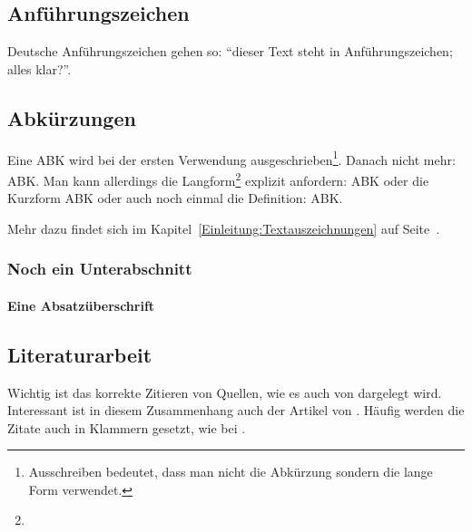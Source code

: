 \subsection{Anführungszeichen}

Deutsche Anführungszeichen gehen so: "`dieser Text steht in \glq Anführungszeichen\grq; alles klar?"'.


\subsection{Abkürzungen}

Eine \ac{ABK} wird bei der ersten Verwendung ausgeschrieben\footnote{Ausschreiben bedeutet, dass man nicht die Abkürzung sondern die lange Form verwendet.}. Danach nicht mehr: \ac{ABK}. Man kann allerdings die Langform\footnote{\blindtext} explizit anfordern: \acl{ABK} oder die Kurzform \acs{ABK} oder auch noch einmal die Definition: \acf{ABK}.

Mehr dazu findet sich im Kapitel~\ref{Einleitung:Textauszeichnungen} auf Seite~\pageref{Einleitung:Textauszeichnungen}.


\subsubsection{Noch ein Unterabschnitt}

\paragraph{Eine Absatzüberschrift}
\blindtext[1]


\subsection{Literaturarbeit}

Wichtig ist das korrekte Zitieren von Quellen, wie es auch von \cite{Kornmeier2011} dargelegt wird. Interessant ist in diesem Zusammenhang auch der Artikel von \cite{Vixie2007}. Häufig werden die Zitate auch in Klammern gesetzt, wie bei \citep{Kornmeier2011}.

\blindtext[4]